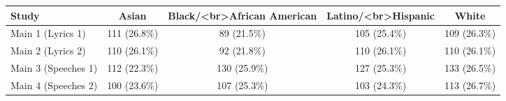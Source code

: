 \begin{table}
\fontsize{12.0pt}{14.4pt}\selectfont
\begin{tabular*}{\linewidth}{@{\extracolsep{\fill}}lcccc}
\toprule
Study & Asian & Black/<br>African American & Latino/<br>Hispanic & White \\ 
\midrule\addlinespace[2.5pt]
Main 1 (Lyrics 1) & 111 (26.8\%) & 89 (21.5\%) & 105 (25.4\%) & 109 (26.3\%) \\ 
Main 2 (Lyrics 2) & 110 (26.1\%) & 92 (21.8\%) & 110 (26.1\%) & 110 (26.1\%) \\ 
Main 3 (Speeches 1) & 112 (22.3\%) & 130 (25.9\%) & 127 (25.3\%) & 133 (26.5\%) \\ 
Main 4 (Speeches 2) & 100 (23.6\%) & 107 (25.3\%) & 103 (24.3\%) & 113 (26.7\%) \\ 
\bottomrule
\end{tabular*}
\end{table}

